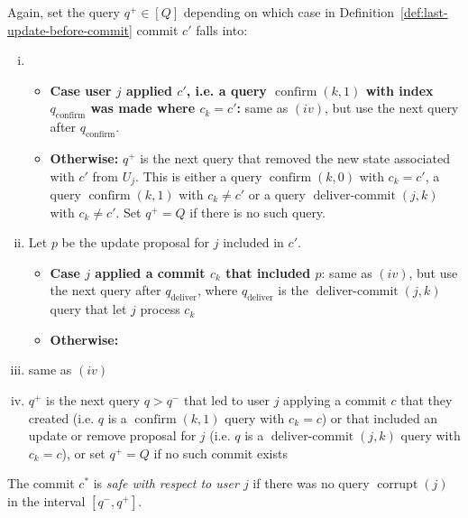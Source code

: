 \begin{definition}
	Again, set the query $q^+ \in [Q]$ depending on which case in Definition~\ref{def:last-update-before-commit} commit $c'$ falls into:
	\begin{enumerate}[(i)]
		\item \begin{itemize}
			      \item \textbf{Case user $j$ applied $c'$, i.e. a query $\operatorname{confirm}(k, 1)$ with index $q_{\mathrm{confirm}}$ was made where $c_k = c'$:} same as $(iv)$, but use the next query after $q_{\mathrm{confirm}}$.
			      \item \textbf{Otherwise:} $q^+$ is the next query that removed the new state associated with $c'$ from $U_j$. This is either a query $\operatorname{confirm}(k, 0)$ with $c_k = c'$, a query $\operatorname{confirm}(k, 1)$ with $c_k \neq c'$ or a query $\operatorname{deliver-commit}(j, k)$ with $c_k \neq c'$. Set $q^+ = Q$ if there is no such query.
		      \end{itemize}
		\item Let $p$ be the update proposal for $j$ included in $c'$.
		      \begin{itemize}
			      \item \textbf{Case $j$ applied a commit $c_k$ that included $p$}: same as $(iv)$, but use the next query after $q_{\mathrm{deliver}}$, where $q_{\mathrm{deliver}}$ is the $\operatorname{deliver-commit}(j, k)$ query that let $j$ process $c_k$
			      \item \textbf{Otherwise:} 
		      \end{itemize}
		\item same as $(iv)$ 
		\item $q^+$ is the next query $q > q^-$ that led to user $j$ applying a commit $c$ that they created (i.e. $q$ is a $\operatorname{confirm}(k, 1)$ query with $c_k = c$) or that included an update or remove proposal for $j$ (i.e. $q$ is a $\operatorname{deliver-commit}(j, k)$ query with $c_k = c$), or set $q^+ = Q$ if no such commit exists
	\end{enumerate}

	The commit $c^*$ is \emph{safe with respect to user $j$} if there was no query $\operatorname{corrupt}(j)$ in the interval $[q^-, q^+]$.
\end{definition}

